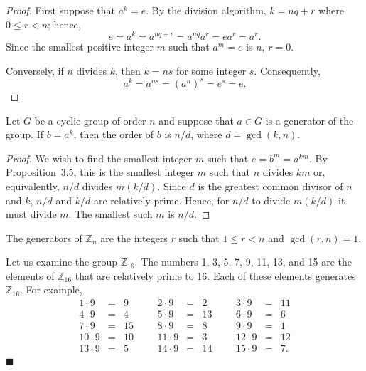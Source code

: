  
\begin{proof}
First suppose that $a^k=e$. By the division algorithm, $k = nq + r$
where $0 \leq r < n$; hence, 
$$
e = a^k = a^{nq + r} = a^{nq} a^r = e a^r = a^r.
$$
Since the smallest positive integer $m$ such that $a^m = e$ is $n$, $r
= 0$.
 
 
Conversely, if $n$ divides $k$, then $k=ns$ for some integer $s$.
Consequently, 
$$
a^k = a^{ns} = (a^n)^s = e^s = e.
$$
\end{proof}
 
 
\begin{theorem}
Let $G$ be a cyclic group of order $n$ and suppose that $a \in G$ is a
generator of the group.  If $b = a^k$, then the order of $b$ is $n
/d$, where $d = \gcd(k,n)$. 
\end{theorem}
 
 
\begin{proof}
We wish to find the smallest integer $m$ such that $e = b^m = a^{km}$.
By Proposition~3.5, this is the smallest integer $m$ such that
$n$ divides $km$ or, equivalently, $n/d$ divides $m(k/d)$.  Since $d$ is
the greatest common divisor of $n$ and $k$, $n/d$ and $k/d$ are
relatively prime. Hence, for $n/d$ to divide $m(k/d)$ it must divide
$m$.  The smallest such $m$ is $n/d$. 
\end{proof}
 
 
\begin{corollary}
The generators of ${\mathbb Z}_n$ are the integers $r$ such that $1 \leq
r < n$ and $\gcd(r,n) =  1$. 
\end{corollary}
 
 
Let us examine the group ${\mathbb Z}_{16}$.  The numbers 1, 3, 5, 7, 9,
11, 13, and 15 are the elements of ${\mathbb Z}_{16}$ that are relatively
prime to 16.  Each of these elements generates ${\mathbb Z}_{16}$. For
example, 
$$
\begin{array}{rclccrclccrcl}
1 \cdot 9  & = & 9  &&& 2 \cdot 9  & = & 2  &&&	3 \cdot 9  & = & 11 \\
4 \cdot 9  & = & 4  &&& 5 \cdot 9  & = & 13 &&&	6 \cdot 9  & = & 6  \\
7 \cdot 9  & = & 15 &&& 8 \cdot 9  & = & 8  &&&	9 \cdot 9  & = & 1  \\
10 \cdot 9 & = & 10 &&& 11 \cdot 9 & = & 3  &&&	12 \cdot 9 & = & 12 \\
13 \cdot 9 & = & 5  &&& 14 \cdot 9 & = & 14 &&&	15 \cdot 9 & = & 7.
\end{array}
$$
\hspace{\fill} $\blacksquare$
 
